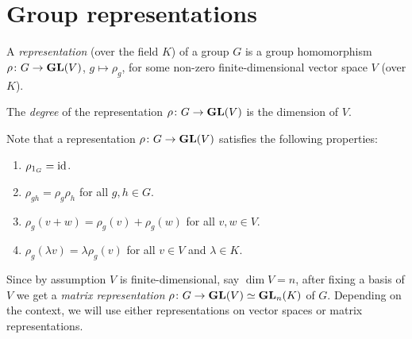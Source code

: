 \section{Group representations}

\begin{definition}
	A \emph{representation} (over the field $K$) of a group $G$ is a group homomorphism
	$\rho\colon G\to\mathbf{GL}(V)$, $g\mapsto\rho_g$, for some non-zero finite-dimensional 
        vector space $V$ (over $K$).
\end{definition}

The \emph{degree} of the representation $\rho\colon G\to\mathbf{GL}(V)$ is the dimension of $V$. 

Note that a representation $\rho\colon G\to\mathbf{GL}(V)$
satisfies the following properties:
\begin{enumerate}
    \item $\rho_{1_G}=\operatorname{id}$.
    \item $\rho_{gh}=\rho_g\rho_h$ for all $g,h\in G$.
    \item $\rho_g(v+w)=\rho_g(v)+\rho_g(w)$ for all $v,w\in V$.
    \item $\rho_g(\lambda v)=\lambda \rho_g(v)$ for all $v\in V$ and $\lambda\in K$. 
\end{enumerate}

Since by assumption
$V$ is finite-dimensional, say $\dim V=n$, after fixing a basis of $V$ we get a \emph{matrix representation} 
$\rho\colon G\to\mathbf{GL}(V)\simeq\mathbf{GL}_n(K)$ of $G$. Depending on the context, we will use either representations on vector spaces or matrix representations.  


